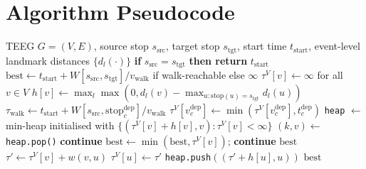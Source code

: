 \documentclass[letterpaper]{article}
\begin{document}
\section{Algorithm Pseudocode}
\label{app:alg}

\begin{algorithm}[H]
\caption{TEEG-ALT static EA query}
\label{alg:teeg-alt}
\begin{algorithmic}[1]
\REQUIRE TEEG $G=(V,E)$, source stop $s_\text{src}$, target stop $s_\text{tgt}$, start time $t_\text{start}$, event-level landmark distances $\{d_l(\cdot)\}$
\STATE \textbf{if} $s_\text{src} = s_\text{tgt}$ \textbf{then return} $t_\text{start}$
\STATE $\text{best} \gets t_\text{start} + W[s_\text{src}, s_\text{tgt}]/v_\text{walk}$ if walk-reachable else $\infty$
\STATE $\tau^V[v] \gets \infty$ for all $v \in V$
\STATE $h[v] \gets \max_l \max(0, d_l(v) - \max_{u: \text{stop}(u)=s_\text{tgt}} d_l(u))$
  \STATE $\tau_\text{walk} \gets t_\text{start} + W[s_\text{src}, \text{stop}^\text{dep}_c]/v_\text{walk}$
    \STATE $\tau^V[v^\text{dep}_c] \gets \min(\tau^V[v^\text{dep}_c], t^\text{dep}_c)$
  \ENDIF
\ENDFOR
\STATE \texttt{heap} $\gets$ min-heap initialised with $\{(\tau^V[v] + h[v], v) : \tau^V[v] < \infty\}$
  \STATE $(k, v) \gets$ \texttt{heap.pop()}
   \STATE \textbf{continue} \ENDIF
    \STATE $\text{best} \gets \min(\text{best}, \tau^V[v])$; \textbf{continue}
  \ENDIF
    \RETURN $\text{best}$
  \ENDIF
    \STATE $\tau' \gets \tau^V[v] + w(v, u)$
      \STATE $\tau^V[u] \gets \tau'$
      \STATE \texttt{heap.push}$((\tau' + h[u], u))$
    \ENDIF
  \ENDFOR
\ENDWHILE
\RETURN $\text{best}$
\end{algorithmic}
\end{algorithm}
\end{document}
